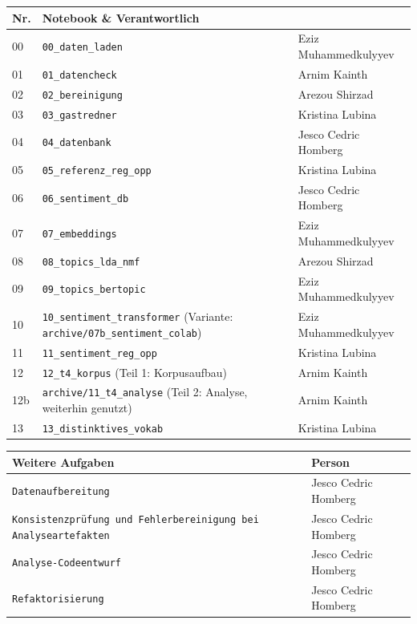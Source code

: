 \begin{center}
  \footnotesize
  \renewcommand{\arraystretch}{0.85}
  \begin{tabular}{@{}l p{8cm} l@{}}
    \toprule
    Nr.      & Notebook \& Verantwortlich \\
    \midrule
    00       & \texttt{00\_daten\_laden} & Eziz Muhammedkulyyev \\
    01       & \texttt{01\_datencheck} & Arnim Kainth \\
    02       & \texttt{02\_bereinigung} & Arezou Shirzad \\
    03       & \texttt{03\_gastredner} & Kristina Lubina \\
    04       & \texttt{04\_datenbank} & Jesco Cedric Homberg\\
    05       & \texttt{05\_referenz\_reg\_opp} & Kristina Lubina \\
    06       & \texttt{06\_sentiment\_db} & Jesco Cedric Homberg \\
    07       & \texttt{07\_embeddings} & Eziz Muhammedkulyyev \\
    08       & \texttt{08\_topics\_lda\_nmf} & Arezou Shirzad \\
    09       & \texttt{09\_topics\_bertopic} & Eziz Muhammedkulyyev \\
    10       & \texttt{10\_sentiment\_transformer} (Variante: \texttt{archive/07b\_sentiment\_colab}) & Eziz Muhammedkulyyev \\
    11       & \texttt{11\_sentiment\_reg\_opp} & Kristina Lubina \\
    12       & \texttt{12\_t4\_korpus} (Teil 1: Korpusaufbau) & Arnim Kainth \\
    12b      & \texttt{archive/11\_t4\_analyse} (Teil 2: Analyse, weiterhin genutzt) & Arnim Kainth \\
    13       & \texttt{13\_distinktives\_vokab} & Kristina Lubina \\
    \bottomrule
  \end{tabular}


    \begin{tabular}{p{8cm} l@{}}
    \toprule
    Weitere Aufgaben & Person \\
    \midrule
    \texttt{Datenaufbereitung} & Jesco Cedric Homberg\\
    \texttt{Konsistenzprüfung und Fehlerbereinigung bei Analyseartefakten} & Jesco Cedric Homberg\\
    \texttt{Analyse-Codeentwurf} & Jesco Cedric Homberg\\
    \texttt{Refaktorisierung} & Jesco Cedric Homberg\\
    \bottomrule
  \end{tabular}
\end{center}
\clearpage
